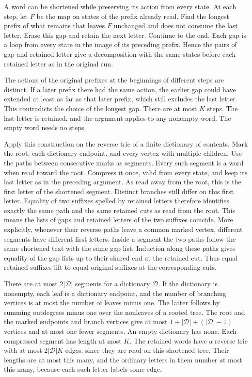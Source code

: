 A word can be shortened while preserving its action from every state.
At each step, let $F$ be the map on states of the prefix already
read. Find the longest prefix of what remains that leaves $F$
unchanged and does not consume the last letter. Erase this gap and
retain the next letter. Continue to the end. Each gap is a loop
from every state in the image of its preceding prefix. Hence the
pairs of gap and retained letter give a decomposition with the
same states before each retained letter as in the original run.

The actions of the original prefixes at the beginnings of
different steps are distinct. If a later prefix there had the
same action, the earlier gap could have extended at least as far
as that later prefix, which still excludes the last letter. This
contradicts the choice of the longest gap. There are at most $K$
steps. The last letter is retained, and the argument applies to
any nonempty word. The empty word needs no steps.

Apply this construction on the reverse trie of a finite dictionary
of contents. Mark the root, each dictionary endpoint, and every
vertex with multiple children. Use the paths between consecutive
marks as segments. Every such segment is a word when read toward
the root. Compress it once, valid from every state, and keep its
last letter as in the preceding argument. As read away from the
root, this is the first letter of the shortened segment. Distinct
branches still differ on this first letter. Equality of two
suffixes spelled by retained letters therefore identifies exactly
the same path and the same retained cuts as read from the root.
This means the lists of gaps and retained letters of the two
suffixes coincide. More explicitly, whenever their reverse
paths leave a common marked vertex, different segments have
different first letters. Inside a segment the two paths follow
the same shortened text with the same gap list. Induction along
these paths gives equality of the gap lists up to their shared end
at the retained cut. Thus equal retained suffixes lift to equal
original suffixes at the corresponding cuts.

There are at most $2|\mathcal D|$ segments for a dictionary
$\mathcal D$. If the dictionary is nonempty, each leaf is a
dictionary endpoint, and the number of branching vertices is at
most the number of leaves minus one. The latter follows by summing
outdegrees minus one over the nonleaves of a rooted tree. The root
and the marked endpoints and branch vertices give at most
$1+|\mathcal D|+(|\mathcal D|-1)$ vertices and at most one fewer
segments. An empty dictionary has none. Each compressed segment
has length at most $K$. The retained words have a reverse trie
with at most $2|\mathcal D|K$ edges, since they are read on this
shortened tree. Their lengths are at most this many, and the
ordinary letters in them number at most this many, because each
such letter labels some edge.

